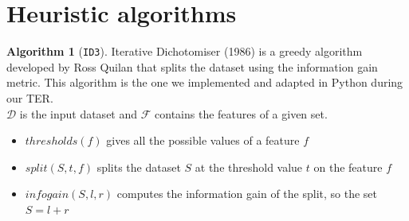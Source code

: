 \documentclass[12pt]{report}
\theoremstyle{definition}
\theoremstyle{definition}
\newtheorem*{algo}{Algorithm}
\theoremstyle{definition}
\begin{document}
\section{Heuristic algorithms}
\begin{algo}[\texttt{ID3}]
    Iterative Dichotomiser (1986) is a greedy algorithm developed by Ross Quilan that splits the dataset
    using the information gain metric. This algorithm is the one we implemented and adapted in Python during
    our TER.\\
    $\mathcal{D}$ is the input dataset and $\mathcal{F}$ contains the features of a given set.

    \begin{algorithm}
        \caption{\texttt{ID3}}\label{alg:two}
        \DontPrintSemicolon

        \;
        \;

    \end{algorithm}

    \begin{itemize}
        \item $thresholds(f)$ gives all the possible values of a feature $f$
        \item $split(S, t, f)$ splits the dataset $S$ at the threshold value $t$ on the feature $f$
        \item $infogain(S, l, r)$ computes the information gain of the split, so the set $S=l+r$ 
    \end{itemize}
\end{algo}
\end{document}
